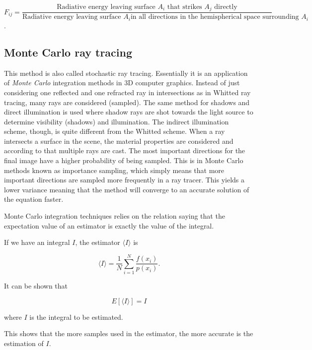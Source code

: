 \documentclass[a4paper]{report}
\begin{document}
\begin{equation}
  F_{ij} = \frac{\text{Radiative energy leaving surface } A_i \text{ that
    strikes } A_j \text{ directly}}{\text{Radiative energy leaving
    surface } A_i \text{in all directions in the hemispherical space
    surrounding } A_i}
\end{equation}.

\subsection{Monte Carlo ray tracing}

This method is also called stochastic ray tracing. Essentially it is
an application of \emph{Monte Carlo} integration methods in 3D computer
graphics. Instead of just considering one reflected and one refracted
ray in intersections as in Whitted ray tracing, many
rays are considered (sampled). The same method for shadows and direct
illumination is used where shadow rays are shot towards the
light source to determine visibility (shadows) and illumination. The
indirect illumination scheme, though, is quite different from the Whitted
scheme. When a ray intersects a surface in the scene, the
material properties are considered and according to that multiple rays
are cast. The most important directions for the final image have a
higher probability of being sampled. This is in Monte Carlo methods
known as importance sampling, which simply means that more important
directions are sampled more frequently in a ray tracer. This yields a
lower variance meaning that the method will converge to an accurate
solution of the equation faster.

Monte Carlo integration techniques relies on the relation saying that the expectation value
of an estimator is exactly the value of the integral.

If we have an integral \(I\), the estimator \(\langle I \rangle\) is

\begin{equation}
  \langle I \rangle = \frac{1}{N}\sum^N_{i=1}\frac{f(x_i)}{p(x_i)}.
  \label{eq:estimator}
\end{equation}

It can be shown that 

\begin{equation}
  E[\langle I \rangle] = I
\end{equation}

where \(I\) is the integral to be estimated.

This shows that the more samples used in the estimator, the more
accurate is the estimation of \(I\).
\end{document}
